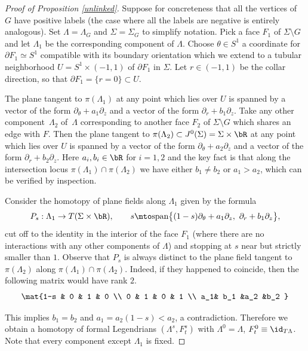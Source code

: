 \begin{proof}[Proof of Proposition \ref{unlinked}]
Suppose for concreteness that all the vertices of $G$ have positive labels (the case where all the labels are negative is entirely analogous). Set $\Lambda=\Lambda_G$ and $\Sigma=\Sigma_G$ to simplify notation. Pick a face $F_1$ of $\Sigma \setminus G$ and let $\Lambda_1$ be the corresponding component of $\Lambda$. Choose $\theta \in S^1$ a coordinate for $\partial F_1 \simeq S^1$ compatible with its boundary orientation which we extend to a tubular neighborhood $U=S^1 \times (-1,1)$ of $\partial F_1$ in $\Sigma$. Let $r \in (-1,1)$ be the collar direction, so that $\partial F_1 = \{ r=0\} \subset U$.

The plane tangent to $\pi(\Lambda_1)$ at any point which lies over $U$ is spanned by a vector of the form $ \partial_\theta + a_1 \partial_z$ and a vector of the form $ \partial_r + b_1 \partial_z$. Take any other component~$\Lambda_2$ of~$\Lambda$ corresponding to another face $F_2$ of $\Sigma \setminus G$ which shares an edge with $F$. Then the plane tangent to $\pi(\Lambda_2) \subset J^0(\Sigma)=\Sigma \times \bR$ at any point which lies over $U$ is spanned by a vector of the form $ \partial_\theta + a_2 \partial_z$ and a vector of the form $ \partial_r + b_2 \partial_z$. Here $a_i,b_i \in \bR$ for $i=1,2$ and the key fact is that along the intersection locus $\pi(\Lambda_1) \cap \pi(\Lambda_2)$ we have either $b_1 \neq b_2$ or $a_1>a_2$, which can be verified by inspection.

Consider the homotopy of plane fields along $\Lambda_1$ given by the formula
\[
P_s : \Lambda_1 \to T(\Sigma \times \bR), \qquad s \mto \text{span} \big\{ (1-s)\partial_\theta + a_1\partial_z, \, \, \partial_r + b_1 \partial_z \big\},
\]
cut off to the identity in the interior of the face $F_1$ (where there are no interactions with any other components of $\Lambda$) and stopping at $s$ near but strictly smaller than $1$. Observe that $P_s$ is always distinct to the plane field tangent to $\pi(\Lambda_2)$ along $\pi(\Lambda_1) \cap \pi(\Lambda_2)$. Indeed, if they happened to coincide, then the following matrix would have rank $2$.
\[\arraycolsep4.5pt \mat{1-s & 0 & 1 & 0 \\
0 & 1 & 0 & 1 \\
a_1& b_1 &a_2 &b_2 } \]

This implies $b_1=b_2$ and $a_1=a_2(1-s)<a_2$, a contradiction. Therefore we obtain a homotopy of formal Legendrians $(\Lambda^s,F^s_t)$ with $\Lambda^0=\Lambda$, $F^0_t \equiv \id_{T \Lambda}$. Note that every component except $\Lambda_1$ is fixed.


\end{proof}

